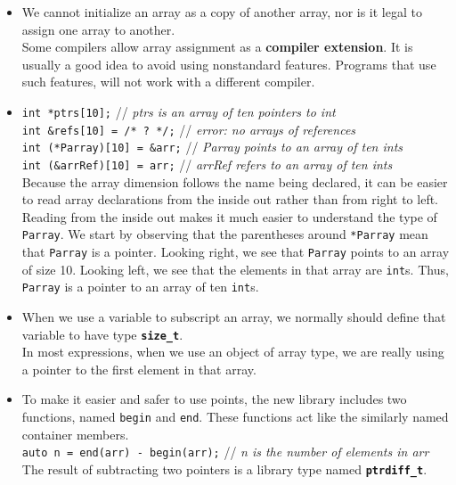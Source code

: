 \begin{itemize}
\item
We cannot initialize an array as a copy of another array, nor is it legal to assign one array to another.\\
Some compilers allow array assignment as a \textbf{compiler extension}. It is usually a good idea to avoid using nonstandard features. Programs that use such features, will not work with a different compiler.

\item
\hspace*{1em}\texttt{int *ptrs[10];} // \textit{ptrs is an array of ten pointers to int}\\
\hspace*{1em}\texttt{int \&refs[10] = /* ? */;} // \textit{error: no arrays of references}\\
\hspace*{1em}\texttt{int (*Parray)[10] = \&arr;} // \textit{Parray points to an array of ten ints}\\
\hspace*{1em}\texttt{int (\&arrRef)[10] = arr;} // \textit{arrRef refers to an array of ten ints}\\
Because the array dimension follows the name being declared, it can be easier to read array declarations from the inside out rather than from right to left. Reading from the inside out makes it much easier to understand the type of \texttt{Parray}. We start by observing that the parentheses around \texttt{*Parray} mean that \texttt{Parray} is a pointer. Looking right, we see that \texttt{Parray} points to an array of size 10. Looking left, we see that the elements in that array are \texttt{int}s. Thus, \texttt{Parray} is a pointer to an array of ten \texttt{int}s.

\item
When we use a variable to subscript an array, we normally should define that variable to have type \textbf{\texttt{size\_t}}.\\
In most expressions, when we use an object of array type, we are really using a pointer to the first element in that array.\\

\item
To make it easier and safer to use points, the new library includes two functions, named \texttt{begin} and \texttt{end}. These functions act like the similarly named container members.\\
\hspace*{1em}\texttt{auto n = end(arr) - begin(arr);} // \textit{n is the number of elements in arr}\\
The result of subtracting two pointers is a library type named \textbf{\texttt{ptrdiff\_t}}.


\end{itemize}
